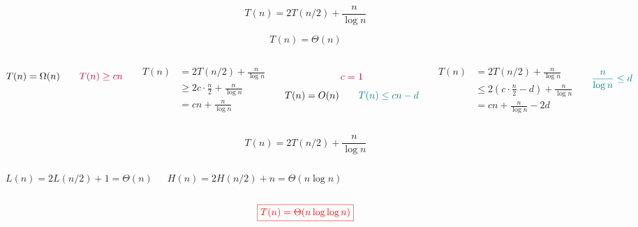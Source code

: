 \begin{frame}{}
  \[
    T(n) = 2T(n/2) + \frac{n}{\log n}
  \]

  \pause
  \[
    \boxed{T(n) = \Theta(n)}
  \]

  \begin{columns}
      \pause
      \[
        T(n) = \Omega(n) \qquad \textcolor{purple}{T(n) \ge cn}
      \]

      \pause
      \begin{align*}
        T(n) &= 2T(n/2) + \frac{n}{\log n} \\
             &\ge 2 c \cdot \frac{n}{2} + \frac{n}{\log n} \\
             &= cn + \frac{n}{\log n}
      \end{align*}

      \pause
      \[
        \textcolor{purple}{c = 1}
      \]
      \pause
      \[
        T(n) = O(n) \qquad \textcolor{teal}{T(n) \le cn - d}
      \]

      \pause
      \begin{align*}
        T(n) &= 2T(n/2) + \frac{n}{\log n} \\
             &\le 2 (c \cdot \frac{n}{2} - d) + \frac{n}{\log n} \\
             &= cn + \frac{n}{\log n} - 2d
      \end{align*}

      \pause
      \[
        \textcolor{teal}{\frac{n}{\log n} \le d}
      \]
  \end{columns}
\end{frame}

\begin{frame}{}
  \[
    T(n) = 2T(n/2) + \frac{n}{\log n}
  \]

  \begin{columns}
      \pause
      \[
        L(n) = 2L(n/2) + 1 = \Theta(n)
      \]

      \pause
      \[
        H(n) = 2H(n/2) + n = \Theta(n \log n)
      \]

  \end{columns}

  \pause
  \vspace{1.00cm}
  \[
    \textcolor{red}{\boxed{T(n) = \Theta(n \log \log n)}}
  \]
\end{frame}

